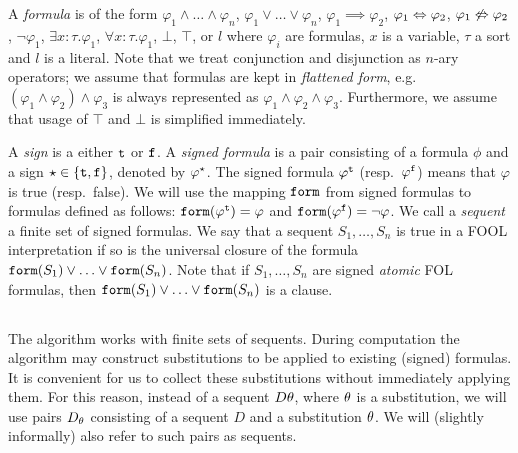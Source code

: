 A \emph{formula} is of the form $\varphi_1 \wedge \ldots \wedge \varphi_n$, $\varphi_1 \vee \ldots \vee \varphi_n$, $\varphi_1 \implies \varphi_2$, $\varphi_1 \Leftrightarrow \varphi_2$, $\varphi_1 \not\Leftrightarrow \varphi_2$, $\neg \varphi_1$, $\exists x : \tau. \varphi_1$, $\forall x : \tau. \varphi_1$, $\bot$, $\top$, or $l$ where $\varphi_i$  are formulas, $x$ is a variable, $\tau$ a sort and $l$ is a literal. Note that we treat conjunction and disjunction as $n$-ary operators; we assume that formulas are kept in \emph{flattened form}, e.g.\ $(\varphi_1 \wedge \varphi_2) \wedge \varphi_3$ is always represented as $\varphi_1 \wedge \varphi_2 \wedge \varphi_3$. Furthermore, we assume that usage of $\top$ and $\bot$ is simplified immediately. 

A \emph{sign} is a either $\mathtt{t}$ or $\mathtt{f}$. A \emph{signed formula} is a
pair consisting of a formula $\phi$ and a sign $\star \in \{\mathtt{t},\mathtt{f}\}$, denoted by
${\varphi}^{\star}$.
 The signed formula $\varphi^{\mathtt{t}}$ (resp.\ $\varphi^{\mathtt{f}}$) means that $\varphi$ is true (resp.\ false). We will use the mapping $\mathtt{form}$
from signed formulas to formulas defined as follows:
$\mathtt{form}({{\varphi}^{\mathtt{t}}}) = \varphi$ and
$\mathtt{form}({{\varphi}^{\mathtt{f}}}) = \neg \varphi$. 
We call a \emph{sequent} a finite set of signed formulas. We say that a sequent
$S_1,\ldots,S_n$ is true in a FOOL interpretation if so is the universal closure
of the formula $\mathtt{form}({S_1}) \lor \ldots \lor \mathtt{form}({S_n})$. Note
that if $S_1,\ldots,S_n$ are signed \emph{atomic} FOL formulas, then
$\mathtt{form}({S_1}) \lor \ldots \lor \mathtt{form}({S_n})$ is a clause.

\subsection{\newcnf{}}

The \newcnf{} algorithm \cite{newcnf_fol} works with finite sets of sequents. During computation
the algorithm may construct substitutions to be applied to existing (signed) formulas. 
It is convenient for us to collect these substitutions without immediately applying
them. For this reason, instead of a sequent $D\theta$, where $\theta$ is a
substitution, we will use pairs ${D}_{\theta}$ consisting of a sequent
$D$ and a substitution $\theta$. We will (slightly informally) also refer to
such pairs as sequents. 


